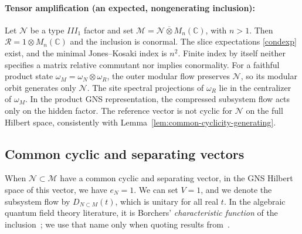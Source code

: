 \documentclass[a4paper,11pt]{article}
\theoremstyle{definition}
\newcommand{\mN}{\mathcal{N}}
\newcommand{\mM}{\mathcal{M}}
\begin{document}
\paragraph{Tensor amplification (an expected, nongenerating inclusion):}
Let $\mathcal N$ be a type $III_1$ factor and set $\mathcal M=\mathcal N\overline\otimes M_n(\mathbb C)$,
with $n>1$. Then $\mathcal R=1\otimes M_n(\mathbb C)$ and the inclusion is conormal.
The slice expectations \eqref{condexp} exist, and the minimal Jones--Kosaki index
is $n^2$. Finite index by itself neither specifies a matrix relative commutant
nor implies conormality.
For a faithful product state $\omega_M=\omega_N\otimes\omega_R$, the outer modular
flow preserves $\mathcal N$, so its modular orbit generates only $\mathcal N$.
The site spectral projections of $\omega_R$ lie in the centralizer of $\omega_M$.
In the product GNS representation, the compressed subsystem flow acts only on
the hidden factor. The reference vector is not cyclic for $\mathcal N$ on the full Hilbert
space, consistently with Lemma~\ref{lem:common-cyclicity-generating}.





\subsection{Common cyclic and separating vectors}

When $\mN\subset \mM$ have a common cyclic and separating vector, in the GNS Hilbert space of this vector, we have $e_N=1$. We can set $V=1$, and we denote the subsystem flow by $D_{N\subset M}(t)$, which is unitary for all real $t$.  In the algebraic quantum field theory literature, it is Borchers' \emph{characteristic function} of the inclusion~\cite{revolutionizing}; we use that name only when quoting results from~\cite{revolutionizing}.
\end{document}
